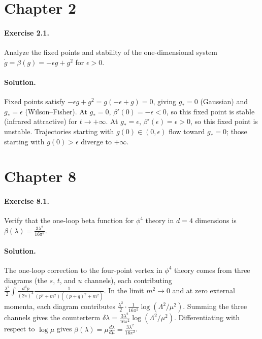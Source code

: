 \documentclass[11pt, twoside, openright]{book}
\theoremstyle{dotted}
\theoremstyle{definition}
\begin{document}
\section*{Chapter 2}

\paragraph{Exercise 2.1.} Analyze the fixed points and stability of the one-dimensional
system $\dot g = \beta(g) = -\epsilon g + g^2$ for $\epsilon > 0$.

\paragraph{Solution.} Fixed points satisfy $-\epsilon g + g^2 = g(-\epsilon + g) = 0$,
giving $g_* = 0$ (Gaussian) and $g_* = \epsilon$ (Wilson--Fisher). At $g_* = 0$,
$\beta'(0) = -\epsilon < 0$, so this fixed point is stable (infrared attractive)
for $t \to +\infty$. At $g_* = \epsilon$, $\beta'(\epsilon) = \epsilon > 0$, so
this fixed point is unstable. Trajectories starting with $g(0) \in (0, \epsilon)$
flow toward $g_* = 0$; those starting with $g(0) > \epsilon$ diverge to $+\infty$.

\section*{Chapter 8}

\paragraph{Exercise 8.1.} Verify that the one-loop beta function for $\phi^4$
theory in $d = 4$ dimensions is $\beta(\lambda) = \frac{3\lambda^2}{16\pi^2}$.

\paragraph{Solution.} The one-loop correction to the four-point vertex in $\phi^4$
theory comes from three diagrams (the $s$, $t$, and $u$ channels), each contributing
$\frac{\lambda^2}{2}\int \frac{d^4p}{(2\pi)^4}\frac{1}{(p^2+m^2)((p+q)^2+m^2)}$.
In the limit $m^2 \to 0$ and at zero external momenta, each diagram contributes
$\frac{\lambda^2}{2} \cdot \frac{1}{16\pi^2}\log(\Lambda^2/\mu^2)$. Summing the
three channels gives the counterterm $\delta\lambda = \frac{3\lambda^2}{16\pi^2}
\log(\Lambda^2/\mu^2)$. Differentiating with respect to $\log\mu$ gives
$\beta(\lambda) = \mu\frac{d\lambda}{d\mu} = \frac{3\lambda^2}{16\pi^2}$.
\end{document}
